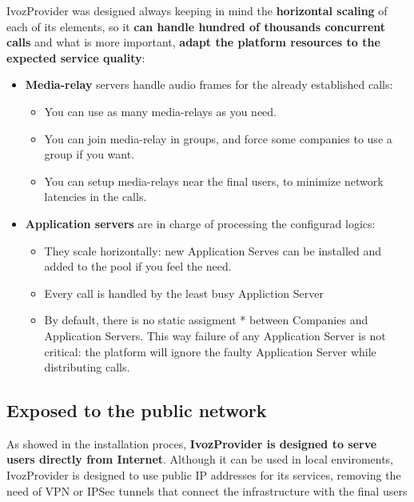 \documentclass[letterpaper,10pt,english]{sphinxmanual}
\begin{document}
IvozProvider was designed always keeping in mind the \textbf{horizontal
scaling} of each of its elements, so it \textbf{can handle hundred of
thousands concurrent calls} and what is more important, \textbf{adapt the
platform resources to the expected service quality}:
\begin{itemize}
\item {} 
\textbf{Media-relay} servers handle audio frames for the already established
calls:
\begin{itemize}
\item {} 
You can use as many media-relays as you need.

\item {} 
You can join media-relay in groups, and force some companies to use a
group if you want.

\item {} 
You can setup media-relays near the final users, to minimize network
latencies in the calls.

\end{itemize}

\item {} 
\textbf{Application servers} are in charge of processing the configurad logics:
\begin{itemize}
\item {} 
They scale horizontally: new Application Serves can be installed and
added to the pool if you feel the need.

\item {} 
Every call is handled by the least busy Appliction Server

\item {} 
By default, there is no static assigment * between Companies and
Application Servers. This way failure of any Application Server is not
critical: the platform will ignore the faulty Application Server while
distributing calls.

\end{itemize}

\end{itemize}


\subsection{Exposed to the public network}
\label{intro/what_is_ivozprovider:exposed-to-the-public-network}\label{intro/what_is_ivozprovider:exposed}
As showed in the installation proces, \textbf{IvozProvider is designed to serve
users directly from Internet}. Although it can be used in local
enviroments, IvozProvider is designed to use public IP addresses for its
services, removing the need of VPN or IPSec tunnels that connect the
infrastructure with the final users
\end{document}
